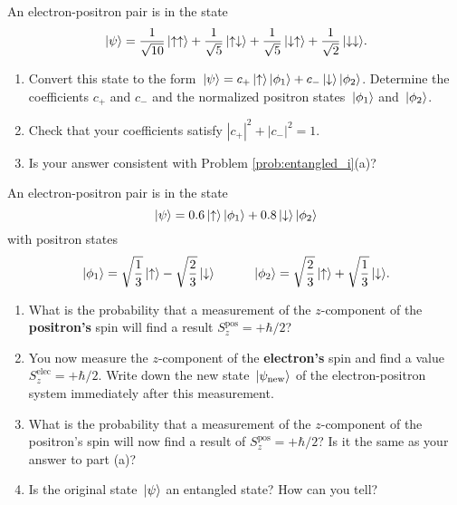 \begin{problem}
  \label{prob:entangled_ii}
  An electron-positron pair is in the state
  \[
  \,|\mbox{$\psi$}\rangle = \frac{1}{\sqrt{10}}\,|\mbox{$\uparrow\uparrow$}\rangle
  +\frac{1}{\sqrt{5}}\,|\mbox{$\uparrow\downarrow$}\rangle +
  \frac{1}{\sqrt{5}}\,|\mbox{$\downarrow\uparrow$}\rangle +
  \frac{1}{\sqrt{2}}\,|\mbox{$\downarrow\downarrow$}\rangle .
  \]
  \begin{enumerate}
  \item Convert this state to the form $\,|\mbox{$\psi$}\rangle =
    c_+\,|\mbox{$\uparrow$}\rangle\,|\mbox{$\phi_1$}\rangle + c_-\,|\mbox{$\downarrow$}\rangle\,|\mbox{$\phi_2$}\rangle$.
    Determine the coefficients $c_+$ and $c_-$ and the normalized
    positron states $\,|\mbox{$\phi_1$}\rangle$ and $\,|\mbox{$\phi_2$}\rangle$.
  \item Check that your coefficients satisfy $|c_+|^2+|c_-|^2=1$.
  \item Is your answer consistent with Problem
    \ref{prob:entangled_i}(a)?
  \end{enumerate}
\end{problem}



\begin{problem}
An electron-positron pair is in the state
\[
\,|\mbox{$\psi$}\rangle = 0.6 \,|\mbox{$\uparrow$}\rangle \,|\mbox{$\phi_1$}\rangle 
  + 0.8 \,|\mbox{$\downarrow$}\rangle \,|\mbox{$\phi_2$}\rangle
\]
with positron states
\[
\,|\mbox{$\phi_1$}\rangle = 
\sqrt{\frac{1}{3}} \,|\mbox{$\uparrow$}\rangle - \sqrt{\frac{2}{3}} \,|\mbox{$\downarrow$}\rangle 
\qquad\quad
\,|\mbox{$\phi_2$}\rangle = 
\sqrt{\frac{2}{3}} \,|\mbox{$\uparrow$}\rangle + \sqrt{\frac{1}{3}} \,|\mbox{$\downarrow$}\rangle. 
\]

\begin{enumerate}
\item What is the probability that a measurement of the $z$-component
  of the \textbf{positron's} spin will find a result $S_z^\text{pos} =
  +\hbar/2$?

\item You now measure the $z$-component of the \textbf{electron's}
  spin and find a value $S_z^\text{elec} = +\hbar/2$. Write down the new
  state $\,|\mbox{$\psi_\text{new}$}\rangle$ of the electron-positron system
  immediately after this measurement.

\item What is the probability that a measurement of the $z$-component
  of the positron's spin will now find a result of $S_z^\text{pos} =
  +\hbar/2$? Is it the same as your answer to part (a)?

\item Is the original state $\,|\mbox{$\psi$}\rangle$ an entangled state? How can
  you tell?
\end{enumerate}
\end{problem}

